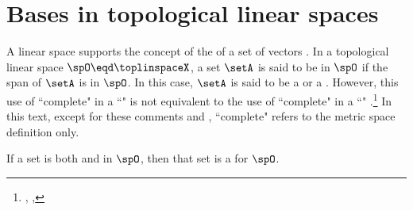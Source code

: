\section{Bases in topological linear spaces}
A linear space supports the concept of the  of a set of vectors .
In a topological linear space $\spO\eqd\toplinspaceX$, a set $\setA$ is said to be  in $\spO$
if the span of $\setA$ is  in $\spO$.
In this case, $\setA$ is said to be a  or a .
However, this use of ``complete" in a ``" is not equivalent to
the use of ``complete" in a ``" .\footnote{%
  ,
  ,
  }
In this text, except for these comments and ,
``complete" refers to the metric space definition  only.


If a set is both  and   in $\spO$, then
that set is a   for $\spO$.

